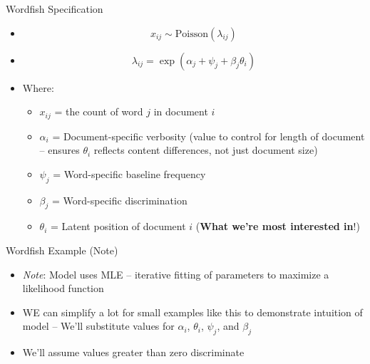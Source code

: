 \documentclass[
  ignorenonframetext,
  aspectratio=169]{beamer}
\begin{document}
\begin{frame}{Wordfish Specification}
\label{wordfish-specification}
\begin{itemize}
\item[] $$x_{ij} \sim \text{Poisson}(\lambda_{ij})$$
\item[]  $$\lambda_{ij} = \exp(\alpha_{j} + \psi_j + \beta_j\theta_i) $$
\item[] Where: 
\footnotesize
  \begin{itemize}
  \item $x_{ij}$ = the count of word $j$ in document $i$ 
\item $\alpha_{i}$ = Document-specific verbosity (value to control for length of document -- ensures $\theta_i$ reflects content differences, not just document size) 
\item $\psi_j$ = Word-specific baseline frequency 
\item $\beta_j$ = Word-specific discrimination 
\item $\theta_i$ = Latent position of document $i$ (\textbf{What we're most interested in}!)
  \end{itemize}
\end{itemize}
\end{frame}

\begin{frame}{Wordfish Example (Note)}
\label{wordfish-example-note}
\begin{itemize}
\item \emph{Note}: Model uses MLE -- iterative fitting of parameters to maximize a likelihood function \par \vspace{2.5mm}
\item WE can simplify a lot for small examples like this to demonstrate intuition of model -- We'll substitute values for $\alpha_i$, $\theta_i$, $\psi_j$, and $\beta_j$ \par \vspace{2.5mm}
\item We'll assume values greater than zero discriminate  \par \vspace{2.5mm}
\end{itemize}
\end{frame}
\end{document}
